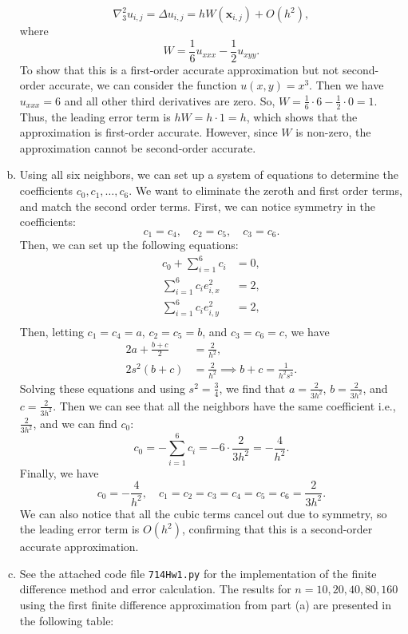 \documentclass{article}
\renewcommand{\vec}[1]{\mathbf{#1}}
\newcommand{\vx}{\vec{x}}
\begin{document}
\begin{enumerate}[(a)]
  \begin{equation*}
    \nabla^2_3 u_{i,j} = \Delta u_{i,j} = h W(\vx_{i,j}) + O(h^2),
  \end{equation*}
  where
  \begin{equation*}
    W = \frac{1}{6} u_{xxx} - \frac{1}{2} u_{xyy}.
  \end{equation*} %
  To show that this is a first-order accurate approximation but not second-order accurate, we can consider the function $u(x,y) = x^3$. Then we have $u_{xxx} = 6$ and all other third derivatives are zero. So, $W = \frac{1}{6} \cdot 6 - \frac{1}{2} \cdot 0 = 1$. Thus, the leading error term is $h W = h \cdot 1 = h$, which shows that the approximation is first-order accurate. However, since $W$ is non-zero, the approximation cannot be second-order accurate.
  \item Using all six neighbors, we can set up a system of equations to determine the coefficients $c_0, c_1, \ldots, c_6$. We want to eliminate the zeroth and first order terms, and match the second order terms. First, we can notice symmetry in the coefficients:
  \begin{equation*}
    c_1 = c_4, \quad c_2 = c_5, \quad c_3 = c_6.
  \end{equation*}
  Then, we can set up the following equations:
  \begin{align*}
    c_0 + \sum_{i=1}^6 c_i & = 0, \\
    \sum_{i=1}^6 c_i e^2_{i,x} & = 2, \\
    \sum_{i=1}^6 c_i e^2_{i,y} & = 2, \\
  \end{align*}
  Then, letting $c_1 = c_4 = a$, $c_2 = c_5 = b$, and $c_3 = c_6 = c$, we have
  \begin{align*}
    2a + \frac{b + c}{2} &= \frac{2}{h^2}, \\
    2s^2(b + c) &= \frac{2}{h^2} \implies b + c = \frac{1}{h^2 s^2}.
  \end{align*}
  Solving these equations and using $s^2 = \frac{3}{4}$, we find that $a = \frac{2}{3h^2}$, $b = \frac{2}{3h^2}$, and $c = \frac{2}{3h^2}$. Then we can see that all the neighbors have the same coefficient i.e., $\frac{2}{3h^2}$, and we can find $c_0$:
  \begin{equation*}
    c_0 = -\sum_{i=1}^6 c_i = -6 \cdot \frac{2}{3h^2} = -\frac{4}{h^2}.
  \end{equation*}
  Finally, we have 
  \[
    c_0 = -\frac{4}{h^2}, \quad c_1 = c_2 = c_3 = c_4 = c_5 = c_6 = \frac{2}{3h^2}.
  \]
  We can also notice that all the cubic terms cancel out due to symmetry, so the leading error term is $O(h^2)$, confirming that this is a second-order accurate approximation.




  \item See the attached code file \texttt{714Hw1.py} for the implementation of the finite difference method and error calculation. The results for $n=10,20,40,80,160$ using the first finite difference approximation from part (a) are presented in the following table:
\end{enumerate}
\end{document}
